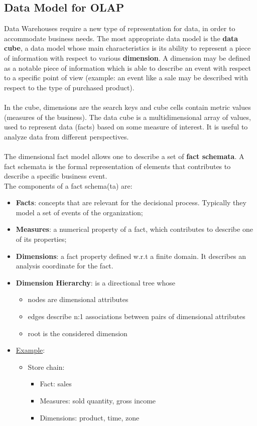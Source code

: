 \documentclass[10pt,a4paper]{article}
\newcommand{\nline}{\\~\\}
\begin{document}
\begin{justify}
\subsection{Data Model for OLAP}
Data Warehouses require a new type of representation for data, in order to accommodate business needs. The most appropriate data model is the \textbf{data cube}, a data model whose main characteristics is its ability to represent a piece of information with respect to various \textbf{dimension}. A dimension may be defined as a notable piece of information which is able to describe an event with respect to a specific point of view (example: an event like a sale may be described with respect to the type of purchased product). \nline
In the cube, dimensions are the search keys and cube cells contain metric values (measures of the business). The data cube is a multidimensional array of values, used to represent data (facts) based on some measure of interest. It is useful to analyze data from different perspectives. \nline
The dimensional fact model allows one to describe a set of \textbf{fact schemata}. A fact schemata is the formal representation of elements that contributes to describe a specific business event. \\
The components of a fact schema(ta) are:
\begin{itemize}
	\item \textbf{Facts}: concepts that are relevant for the decisional process. Typically they model a set of events of the organization;
	\item \textbf{Measures}: a numerical property of a fact, which contributes to describe one of its properties;
	\item \textbf{Dimensions}: a fact property defined w.r.t a finite domain. It describes an analysis coordinate for the fact.
	\item \textbf{Dimension Hierarchy}: is a directional tree whose
	\begin{itemize}
		\item nodes are dimensional attributes
		\item edges describe n:1 associations between pairs of dimensional attributes
		\item root is the considered dimension
    \end{itemize}
	\item \uline{Example}:
	\begin{itemize}
		\item Store chain:
		\begin{itemize}
			\item Fact: sales
			\item Measures: sold quantity, gross income
			\item Dimensions: product, time, zone
		\end{itemize}
	\end{itemize}
\end{itemize}

\end{justify}
\end{document}
